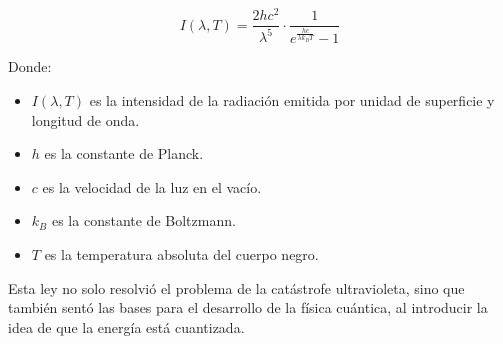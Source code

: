 \documentclass{article}
\begin{document}
\[
I(\lambda, T) = \frac{2 h c^2}{\lambda^5} \cdot \frac{1}{e^{\frac{h c}{\lambda k_B T}} - 1}
\]

Donde:
\begin{itemize}
    \item \(I(\lambda, T)\) es la intensidad de la radiación emitida por unidad de superficie y longitud de onda.
    \item \(h\) es la constante de Planck.
    \item \(c\) es la velocidad de la luz en el vacío.
    \item \(k_B\) es la constante de Boltzmann.
    \item \(T\) es la temperatura absoluta del cuerpo negro.
\end{itemize}

Esta ley no solo resolvió el problema de la catástrofe ultravioleta, sino que también sentó las bases para el desarrollo de la física cuántica, al introducir la idea de que la energía está cuantizada.
\end{document}
